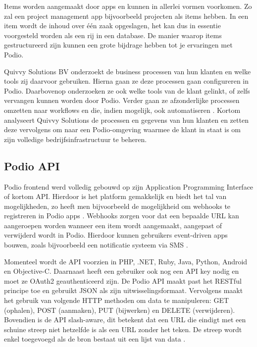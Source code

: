 Items worden aangemaakt door apps en kunnen in allerlei vormen voorkomen. Zo zal een project management app bijvoorbeeld projecten als items hebben. In een item wordt de inhoud over één zaak opgeslagen, het kan dus in essentie voorgesteld worden als een rij in een database. De manier waarop items gestructureerd zijn kunnen een grote bijdrage hebben tot je ervaringen met Podio. \autocite{TallyfyPodio}

Quivvy Solutions BV onderzoekt de business processen van hun klanten en welke tools zij daarvoor gebruiken. Hierna gaan ze deze processen gaan configureren in Podio. Daarbovenop onderzoeken ze ook welke tools van de klant gelinkt, of zelfs vervangen kunnen worden door Podio. Verder gaan ze afzonderlijke processen omzetten naar workflows en die, indien mogelijk, ook automatiseren \autocite{QuivvySoftware}. Kortom analyseert Quivvy Solutions de processen en gegevens van hun klanten en zetten deze vervolgens om naar een Podio-omgeving waarmee de klant in staat is om zijn volledige bedrijfsinfrastructuur te beheren.

\subsection{Podio API}


Podio frontend werd volledig gebouwd op zijn Application Programming Interface of kortom API. Hierdoor is het platform gemakkelijk en biedt het tal van mogelijkheden, zo heeft men bijvoorbeeld de mogelijkheid om webhooks te registreren in Podio apps \autocite{PodioAPI2023}. Webhooks zorgen voor dat een bepaalde URL kan aangeroepen worden wanneer een item wordt aangemaakt, aangepast of verwijderd wordt in Podio. Hierdoor kunnen gebruikers event-driven apps bouwen, zoals bijvoorbeeld een notificatie systeem via SMS \autocite{PodioAPIWebhooks}. 

Momenteel wordt de API voorzien in PHP, .NET, Ruby, Java, Python, Android en Objective-C. Daarnaast heeft een gebruiker ook nog een API key nodig en moet ze OAuth2 geauthenticeerd zijn. De Podio API maakt past het RESTful principe toe en gebruikt JSON als zijn uitwisselingsformaat. Vervolgens maakt het gebruik van volgende HTTP methoden om data te manipuleren: GET (ophalen), POST (aanmaken), PUT (bijwerken) en DELETE (verwijderen). Bovendien is de API slash-aware, dit betekent dat een URL die eindigt met een schuine streep niet hetzelfde is als een URL zonder het teken. De streep wordt enkel toegevoegd als de bron bestaat uit een lijst van data \autocite{PodioAPIConcepts}.



